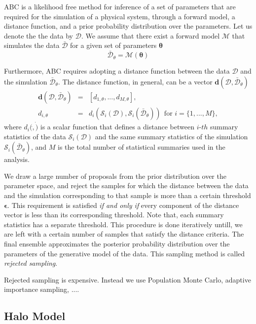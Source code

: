 \documentclass[12pt, preprint]{aastex}
\newcommand{\beq}{\begin{equation}}
\newcommand{\eeq}{\end{equation}}
\begin{document}
ABC is a likelihood free method for inference of a set of parameters that are required for the simulation of a 
physical system, through a forward model, a distance function, and a prior probability distribution over the parameters. 
Let us denote the the data by $\mathcal{D}$. We assume that there exist a forward model $\mathcal{M}$ that 
simulates the data $\bar{\mathcal{D}}$ for a given set of parameters $\bm{\theta}$
\beq
\bar{\mathcal{D}}_{\theta} = \mathcal{M}(\bm{\theta})
\eeq

Furthermore, ABC requires adopting a distance function between the data $\mathcal{D}$ and the simulation $\bar{\mathcal{D}}_{\theta}$.
The distance function, in general, can be a vector $\bm{d}(\mathcal{D},\bar{\mathcal{D}}_{\theta})$
\begin{eqnarray}
\bm{d}(\mathcal{D},\bar{\mathcal{D}}_{\theta}) &=& [d_{1,\theta}, ... , d_{M,\theta}], \\
d_{i,\theta} &=& d_{i}(\mathcal{S}_{i}(\mathcal{D}), \mathcal{S}_{i}(\bar{\mathcal{D}}_{\theta}))  ~~\mbox{for $i=\{1,...,M\}$},
\end{eqnarray}
where $d_{i}(\dot,\dot)$ is a scalar function that defines a distance 
between $i$-$th$ summary statistics of the data $\mathcal{S}_{i}(\mathcal{D})$ and the same summary statistics of 
the simulation $\mathcal{S}_{i}(\bar{\mathcal{D}}_{\theta})$, and $M$ is the total number of statistical summaries 
used in the analysis.

We draw a large number of proposals from the prior distribution over the parameter space, 
and reject the samples for which the distance between the data and the simulation corresponding to that 
sample is more than a certain threshold $\bm{\epsilon}$. This requirement is satisfied \emph{if and only if}
every component of the distance vector is less than its corresponding threshold. Note that, each summary statistics 
has a separate threshold. This procedure is done iteratively untill, we are left with a certain number
of samples that satisfy the distance criteria. The final ensemble approximates the posterior probability distribution over the parameters of the generative model of the data. This sampling method is called \emph{rejected sampling}.

Rejected sampling is expensive. Instead we use Population Monte Carlo, adaptive importance sampling, ....

\subsection{Halo Model}
\end{document}
